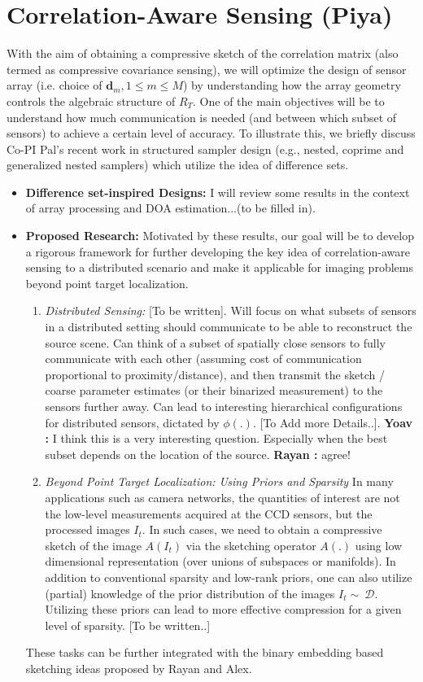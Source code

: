 \documentclass{article}
\newcommand{\comment}[3]{{\color{#1} {\bf #2 :} #3}}
\newcommand{\yoav}[1]{\comment{magenta}{Yoav}{#1}}
\newcommand{\rayan}[1]{\comment{red}{Rayan}{#1}}
\begin{document}
\section{Correlation-Aware Sensing (Piya)} 
With the aim of obtaining a compressive sketch of the correlation matrix (also termed as compressive covariance sensing), we will optimize the design of sensor array (i.e. choice of $\mathbf{d}_m, 1\leq m\leq M$) by understanding how the array geometry controls the algebraic structure of $R_T$. One of the main objectives will be to understand how much communication is needed (and between which subset of sensors) to achieve a certain level of accuracy. To illustrate this, we briefly discuss Co-PI Pal's recent work in structured sampler design (e.g., nested, coprime and generalized nested samplers) which utilize the idea of difference sets.

\begin{itemize}
\item {\bf Difference set-inspired Designs:} I will review some results in the context of array processing and DOA estimation...(to be filled in).
\item {\bf Proposed Research:} Motivated by these results, our goal will be to develop a rigorous framework for further developing the key idea of correlation-aware sensing to a distributed scenario and make it applicable for imaging problems beyond point target localization.
\begin{enumerate}
\item {\em Distributed Sensing:} {\color{red} [To be written]}.  Will focus on what subsets of sensors in a distributed setting should communicate to be able to reconstruct the source scene. Can think of a subset of spatially close sensors to fully communicate with each other (assuming cost of communication proportional to proximity/distance), and then transmit the sketch / coarse parameter estimates (or their binarized measurement) to the sensors further away. Can lead to interesting hierarchical configurations for distributed sensors, dictated by $\phi(.)$. {\color{red} [To Add more Details..]}.
\yoav{I think this is a very interesting question. Especially when the best subset depends on the location of the source.}\rayan{agree!}
\item {\em Beyond Point Target Localization: Using Priors and Sparsity} In many applications such as camera networks, the quantities of interest are not the low-level measurements acquired at the CCD sensors, but the processed images $I_t$. In such cases, we need to obtain a compressive sketch of the image $A (I_t)$ via the sketching operator $A (.)$ using low dimensional representation (over unions of subspaces or manifolds). In addition to conventional sparsity and low-rank priors, one can also utilize (partial) knowledge of the prior distribution of the images $I_t\sim~\mathcal{D}$. Utilizing these priors can lead to more effective compression for a given level of sparsity. {\color{red} [To be written..]}  
\end{enumerate}
{\color{red} These tasks can be further integrated with the binary embedding based sketching ideas proposed by Rayan and Alex.}
\end{itemize}
\end{document}
